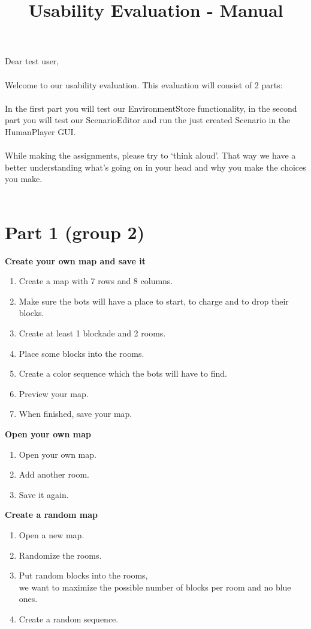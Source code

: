 \documentclass[a4paper]{article}
\title{Usability Evaluation - Manual}
\author{}
\date{}
\begin{document}
\maketitle
Dear test user, \\
\\
Welcome to our usability evaluation. This evaluation will consist of 2 parts: \\
\\
In the first part you will test our EnvironmentStore functionality, in the second part you will test our ScenarioEditor and run the just created Scenario in the HumanPlayer GUI. \\
\\
While making the assignments, please try to ‘think aloud’. That way we have a better understanding what’s going on in your head and why you make the choices you make. \\
\\

\section*{Part 1 (group 2)}
\textbf{Create your own map and save it}
\begin{enumerate}
\item Create a map with 7 rows and 8 columns.
\item Make sure the bots will have a place to start, to charge and to drop their blocks.
\item Create at least 1 blockade and 2 rooms.
\item Place some blocks into the rooms.
\item Create a color sequence which the bots will have to find.
\item Preview your map.
\item When finished, save your map.
\end{enumerate}

\textbf{Open your own map}
\begin{enumerate}
\item Open your own map.
\item Add another room.
\item Save it again.
\end{enumerate}

\textbf{Create a random map}
\begin{enumerate}
\item Open a new map.
\item Randomize the rooms.
\item Put random blocks into the rooms,\\
we want to maximize the possible number of blocks per room and no blue ones.
\item Create a random sequence.
\end{enumerate}
\end{document}
